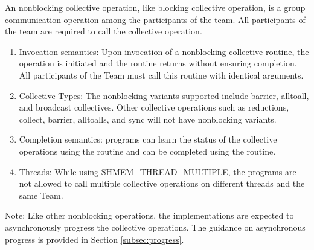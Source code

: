 An \openshmem nonblocking collective operation, like blocking collective
operation, is a group communication operation among the
participants of the team. All participants of the team are required to call the
collective operation.

\begin{enumerate}

\item Invocation semantics: Upon invocation of a nonblocking collective routine,
the operation is initiated and the routine returns without ensuring completion. All participants of the Team
must call this routine with identical arguments.

\item Collective Types: The nonblocking variants supported include barrier, alltoall,
and broadcast collectives. Other collective operations such as
reductions, collect, barrier, alltoalls, and sync will not have nonblocking variants.

\item Completion semantics:  \openshmem programs can learn the status of the collective operations
using the  routine and can be completed using
the  routine.

\item Threads: While using SHMEM\_THREAD\_MULTIPLE, the \openshmem
programs are not allowed to call multiple collective operations on different threads
and the same Team.

\end{enumerate}

Note: Like other nonblocking \openshmem operations, the implementations are
expected to asynchronously progress the collective operations. The guidance on
asynchronous progress is provided in Section \ref{subsec:progress}.



